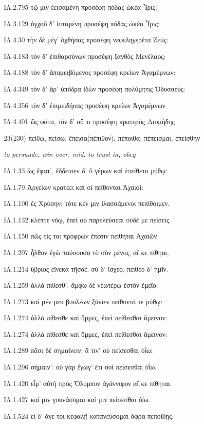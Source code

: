 \begin{enumerate}
{ΙΛ.2.795 τῷ μιν ἐεισαμένη προσέφη πόδας ὠκέα Ἶρις:

ΙΛ.3.129 ἀγχοῦ δ' ἱσταμένη προσέφη πόδας ὠκέα Ἶρις:

ΙΛ.4.30 τὴν δὲ μέγ' ὀχθήσας προσέφη νεφεληγερέτα Ζεύς:

ΙΛ.4.183 τὸν δ' ἐπιθαρσύνων προσέφη ξανθὸς Μενέλαος:

ΙΛ.4.188 τὸν δ' ἀπαμειβόμενος προσέφη κρείων Ἀγαμέμνων:

ΙΛ.4.349 τὸν δ' ἄρ' ὑπόδρα ἰδὼν προσέφη πολύμητις Ὀδυσσεύς:

ΙΛ.4.356 τὸν δ' ἐπιμειδήσας προσέφη κρείων Ἀγαμέμνων

ΙΛ.4.401 ὣς φάτο, τὸν δ' οὔ τι προσέφη κρατερὸς Διομήδης
}

\clearpage
\item[\large 23(230)]{\large \g    πείθω, πείσω, ἔπεισα(πέπιθον), πέποιθα, πέπεισμαι, ἐπείσθην   }

\hspace{0.2cm} \textit{to persuade, win over, mid. to trust in, obey  }

{\g
ΙΛ.1.33 ὣς ἔφατ', ἔδδεισεν δ' ὃ γέρων καὶ ἐπείθετο μύθῳ:

ΙΛ.1.79 Ἀργείων κρατέει καί οἱ πείθονται Ἀχαιοί:

ΙΛ.1.100 ἐς Χρύσην: τότε κέν μιν ἱλασσάμενοι πεπίθοιμεν.

ΙΛ.1.132 κλέπτε νόῳ, ἐπεὶ οὐ παρελεύσεαι οὐδέ με πείσεις.

ΙΛ.1.150 πῶς τίς τοι πρόφρων ἔπεσιν πείθηται Ἀχαιῶν

ΙΛ.1.207 ἦλθον ἐγὼ παύσουσα τὸ σὸν μένος, αἴ κε πίθηαι,

ΙΛ.1.214 ὕβριος εἵνεκα τῆσδε: σὺ δ' ἴσχεο, πείθεο δ' ἡμῖν.

ΙΛ.1.259 ἀλλὰ πίθεσθ': ἄμφω δὲ νεωτέρω ἐστὸν ἐμεῖο:

ΙΛ.1.273 καὶ μέν μευ βουλέων ξύνιεν πείθοντό τε μύθῳ:

ΙΛ.1.274 ἀλλὰ πίθεσθε καὶ ὔμμες, ἐπεὶ πείθεσθαι ἄμεινον:

ΙΛ.1.274 ἀλλὰ πίθεσθε καὶ ὔμμες, ἐπεὶ πείθεσθαι ἄμεινον:

ΙΛ.1.289 πᾶσι δὲ σημαίνειν, ἅ τιν' οὐ πείσεσθαι ὀΐω:

ΙΛ.1.296 σήμαιν': οὐ γὰρ ἔγωγ' ἔτι σοὶ πείσεσθαι ὀΐω.

ΙΛ.1.420 εἶμ' αὐτὴ πρὸς Ὄλυμπον ἀγάννιφον αἴ κε πίθηται.

ΙΛ.1.427 καί μιν γουνάσομαι καί μιν πείσεσθαι ὀΐω.

ΙΛ.1.524 εἰ δ' ἄγε τοι κεφαλῇ κατανεύσομαι ὄφρα πεποίθῃς:

}
\end{enumerate}
